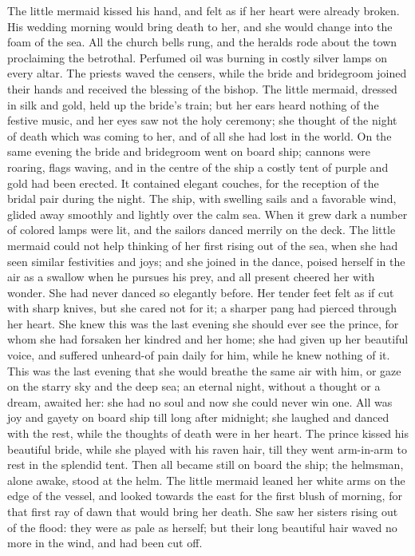 The little mermaid kissed his hand, and felt as if her heart were already broken.
His wedding morning would bring death to her, and she would change into the foam of the sea.
All the church bells rung, and the heralds rode about the town proclaiming the betrothal.
Perfumed oil was burning in costly silver lamps on every altar.
The priests waved the censers, while the bride and bridegroom joined their hands and received the blessing of the bishop.
The little mermaid, dressed in silk and gold, held up the bride’s train; but her ears heard nothing of the festive music, and her eyes saw not the holy ceremony; she thought of the night of death which was coming to her, and of all she had lost in the world.
On the same evening the bride and bridegroom went on board ship; cannons were roaring, flags waving, and in the centre of the ship a costly tent of purple and gold had been erected.
It contained elegant couches, for the reception of the bridal pair during the night.
The ship, with swelling sails and a favorable wind, glided away smoothly and lightly over the calm sea.
When it grew dark a number of colored lamps were lit, and the sailors danced merrily on the deck.
The little mermaid could not help thinking of her first rising out of the sea, when she had seen similar festivities and joys; and she joined in the dance, poised herself in the air as a swallow when he pursues his prey, and all present cheered her with wonder.
She had never danced so elegantly before.
Her tender feet felt as if cut with sharp knives, but she cared not for it; a sharper pang had pierced through her heart.
She knew this was the last evening she should ever see the prince, for whom she had forsaken her kindred and her home; she had given up her beautiful voice, and suffered unheard-of pain daily for him, while he knew nothing of it.
This was the last evening that she would breathe the same air with him, or gaze on the starry sky and the deep sea; an eternal night, without a thought or a dream, awaited her: she had no soul and now she could never win one.
All was joy and gayety on board ship till long after midnight; she laughed and danced with the rest, while the thoughts of death were in her heart.
The prince kissed his beautiful bride, while she played with his raven hair, till they went arm-in-arm to rest in the splendid tent.
Then all became still on board the ship; the helmsman, alone awake, stood at the helm.
The little mermaid leaned her white arms on the edge of the vessel, and looked towards the east for the first blush of morning, for that first ray of dawn that would bring her death.
She saw her sisters rising out of the flood: they were as pale as herself; but their long beautiful hair waved no more in the wind, and had been cut off.

